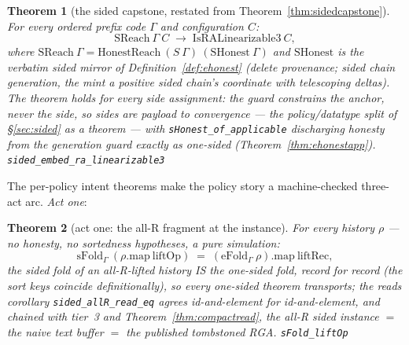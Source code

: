 \documentclass[11pt]{article}
\newtheorem{theorem}{Theorem}[section]
\newcommand{\lean}[1]{\texttt{#1}}
\newcommand{\code}[1]{\texttt{#1}}
\begin{document}
\begin{theorem}[the sided capstone, restated from
Theorem~\ref{thm:sidedcapstone}]
\label{thm:sidedcapstone-mech}
For every ordered prefix code $\Gamma$ and configuration $C$:
\[
  \mathrm{SReach}\ \Gamma\ C \;\to\; \mathrm{IsRALinearizable3}\ C ,
\]
where $\mathrm{SReach}\ \Gamma = \mathrm{HonestReach}\ (S\ \Gamma)\
(\mathrm{SHonest}\ \Gamma)$ and $\mathrm{SHonest}$ is the verbatim
sided mirror of Definition~\ref{def:ehonest} (delete provenance;
sided chain generation, the mint a positive \emph{sided} chain's
coordinate with telescoping deltas). The theorem holds \emph{for
every side assignment}: the guard constrains the anchor, never the
side, so sides are payload to convergence --- the policy/datatype
split of \S\ref{sec:sided} as a theorem --- with
\code{sHonest\_of\_applicable} discharging honesty from the
generation guard exactly as one-sided
(Theorem~\ref{thm:ehonestapp}).
\hfill\lean{sided\_embed\_ra\_linearizable3}
\end{theorem}

\noindent The per-policy intent
theorems make the policy story a machine-checked
three-act arc. \emph{Act one}:

\begin{theorem}[act one: the all-R fragment at the instance]
\label{thm:allr}
For every history $\rho$ --- no honesty, no sortedness hypotheses, a
pure simulation:
\[
  \mathrm{sFold}_\Gamma\ (\rho.\mathrm{map}\ \mathrm{liftOp})
  \;=\; (\mathrm{eFold}_\Gamma\ \rho).\mathrm{map}\
  \mathrm{liftRec} ,
\]
the sided fold of an all-R-lifted history IS the one-sided fold,
record for record (the sort keys coincide definitionally), so every
one-sided theorem transports; the reads corollary
\lean{sided\_allR\_read\_eq} agrees id-and-element for
id-and-element, and chained with tier~3 and
Theorem~\ref{thm:compactread}, the all-R sided instance $=$ the
naive text buffer $=$ the published tombstoned RGA.
\hfill\lean{sFold\_liftOp}
\end{theorem}
\end{document}
